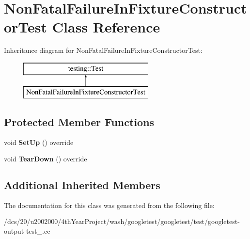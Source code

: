 \hypertarget{classNonFatalFailureInFixtureConstructorTest}{}\section{Non\+Fatal\+Failure\+In\+Fixture\+Constructor\+Test Class Reference}
\label{classNonFatalFailureInFixtureConstructorTest}
Inheritance diagram for Non\+Fatal\+Failure\+In\+Fixture\+Constructor\+Test\+:\begin{figure}[H]
\begin{center}
\leavevmode
\includegraphics[height=2.000000cm]{classNonFatalFailureInFixtureConstructorTest}
\end{center}
\end{figure}
\subsection*{Protected Member Functions}
\begin{DoxyCompactItemize}
\item 
\mbox{\label{classNonFatalFailureInFixtureConstructorTest_aeb0eb1eec27c6732712947713ce24a0e}} 
void {\bfseries Set\+Up} () override
\item 
\mbox{\label{classNonFatalFailureInFixtureConstructorTest_ad5d87bdc012dc66c008e7891008eb6a8}} 
void {\bfseries Tear\+Down} () override
\end{DoxyCompactItemize}
\subsection*{Additional Inherited Members}


The documentation for this class was generated from the following file\+:\begin{DoxyCompactItemize}
\item 
/dcs/20/u2002000/4th\+Year\+Project/wash/googletest/googletest/test/googletest-\/output-\/test\+\_\+.\+cc\end{DoxyCompactItemize}
